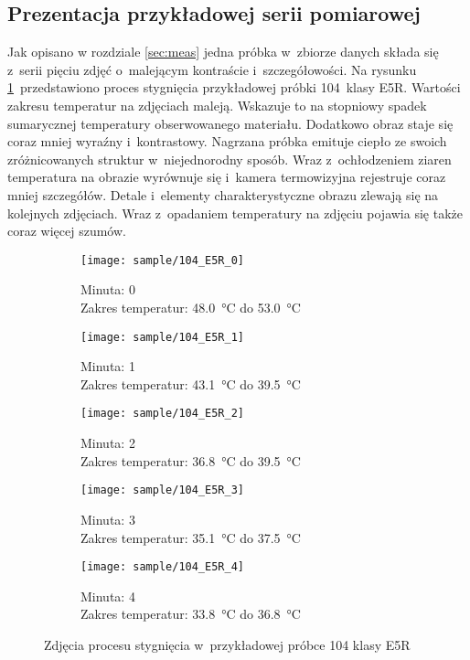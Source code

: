 \subsection{Prezentacja przykładowej serii pomiarowej}
Jak opisano w rozdziale \ref{sec:meas} jedna próbka w~zbiorze danych 
składa się z~serii pięciu zdjęć o~malejącym kontraście i~szczegółowości.
Na rysunku \ref{fig:sample}~przedstawiono proces stygnięcia przykładowej
próbki 104~klasy E5R.
Wartości zakresu temperatur na zdjęciach maleją.
Wskazuje to na stopniowy spadek sumarycznej temperatury obserwowanego
materiału.
Dodatkowo obraz staje się coraz mniej wyraźny i~kontrastowy.
Nagrzana próbka emituje ciepło ze swoich zróżnicowanych struktur
w~niejednorodny sposób.
Wraz z~ochłodzeniem ziaren temperatura na obrazie wyrównuje się i~kamera
termowizyjna rejestruje coraz mniej szczegółów.
Detale i~elementy charakterystyczne obrazu zlewają się na kolejnych zdjęciach.
Wraz z~opadaniem temperatury na zdjęciu pojawia się także coraz więcej szumów.
\begin{figure}[htbp]
	\centering
	\begin{subfigure}{0.45\textwidth}
		\centering
		\texttt{[image: sample/104\_E5R\_0]}
		\caption{Minuta: 0 \\
		         Zakres temperatur: \SI{48.0}{\celsius} do
		         \SI{53.0}{\celsius}}
	\end{subfigure}
	\hspace{0.75cm}
	\vspace{0.5cm}
	\begin{subfigure}{0.45\textwidth}
		\centering
		\texttt{[image: sample/104\_E5R\_1]}
		\caption{Minuta: 1 \\
		         Zakres temperatur: \SI{43.1}{\celsius} do
		         \SI{39.5}{\celsius}}
	\end{subfigure}
	\begin{subfigure}{0.45\textwidth}
		\centering
		\texttt{[image: sample/104\_E5R\_2]}
		\caption{Minuta: 2 \\
		         Zakres temperatur: \SI{36.8}{\celsius} do
		         \SI{39.5}{\celsius}}
	\end{subfigure}
	\hspace{0.75cm}
	\vspace{0.5cm}
	\begin{subfigure}{0.45\textwidth}
		\centering
		\texttt{[image: sample/104\_E5R\_3]}
		\caption{Minuta: 3 \\
		         Zakres temperatur: \SI{35.1}{\celsius} do
		         \SI{37.5}{\celsius}}
	\end{subfigure}
	\begin{subfigure}{0.45\textwidth}
		\centering
		\texttt{[image: sample/104\_E5R\_4]}
		\caption{Minuta: 4 \\
		         Zakres temperatur: \SI{33.8}{\celsius} do
		         \SI{36.8}{\celsius}}
	\end{subfigure}
	\caption{Zdjęcia procesu stygnięcia w~przykładowej próbce 104 klasy E5R}
	\label{fig:sample}
\end{figure}

